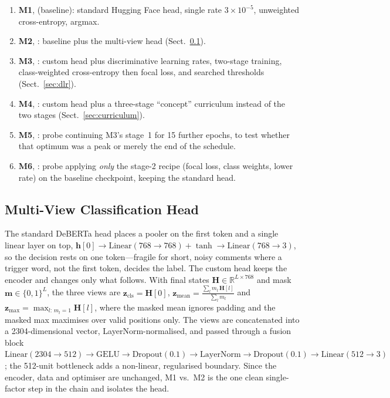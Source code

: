 \begin{enumerate}
  \item \textbf{M1},  (baseline): standard Hugging Face
        head, single rate $3\times10^{-5}$, unweighted cross-entropy, argmax.
  \item \textbf{M2}, : baseline plus the multi-view
        head (Sect.~\ref{sec:head}).
  \item \textbf{M3}, : custom head plus
        discriminative learning rates, two-stage training, class-weighted
        cross-entropy then focal loss, and searched thresholds
        (Sect.~\ref{sec:dlr}).
  \item \textbf{M4}, : custom head plus a
        three-stage ``concept'' curriculum instead of the two stages
        (Sect.~\ref{sec:curriculum}).
  \item \textbf{M5}, : probe continuing
        M3's stage~1 for 15 further epochs, to test whether that optimum was a
        peak or merely the end of the schedule.
  \item \textbf{M6}, : probe applying \emph{only}
        the stage-2 recipe (focal loss, class weights, lower rate) on the
        baseline checkpoint, keeping the standard head.
\end{enumerate}

\subsection{Multi-View Classification Head}
\label{sec:head}
The standard DeBERTa head places a pooler on the first token and a single linear
layer on top, $\mathbf{h}[0] \rightarrow \mathrm{Linear}(768{\to}768)+\tanh
\rightarrow \mathrm{Linear}(768{\to}3)$, so the decision rests on one
token---fragile for short, noisy comments where a trigger word, not the first
token, decides the label.  The custom head keeps the encoder and changes only what
follows.  With final states $\mathbf{H}\in\mathbb{R}^{L\times 768}$ and mask
$\mathbf{m}\in\{0,1\}^{L}$, the three views are
$\mathbf{z}_{\mathrm{cls}}=\mathbf{H}[0]$,
$\mathbf{z}_{\mathrm{mean}}=\tfrac{\sum_{l} m_l\,\mathbf{H}[l]}{\sum_l m_l}$ and
$\mathbf{z}_{\mathrm{max}}=\max_{l:\,m_l=1}\mathbf{H}[l]$, where the masked mean
ignores padding and the masked max maximises over valid positions only.  The views
are concatenated into a 2304-dimensional vector, LayerNorm-normalised, and passed
through a fusion block $\mathrm{Linear}(2304{\to}512)\rightarrow
\mathrm{GELU}\rightarrow \mathrm{Dropout}(0.1)\rightarrow \mathrm{LayerNorm}
\rightarrow \mathrm{Dropout}(0.1)\rightarrow \mathrm{Linear}(512{\to}3)$; the
512-unit bottleneck adds a non-linear, regularised boundary.  Since the encoder,
data and optimiser are unchanged, M1 vs.\ M2 is the one clean single-factor step in
the chain and isolates the head.

